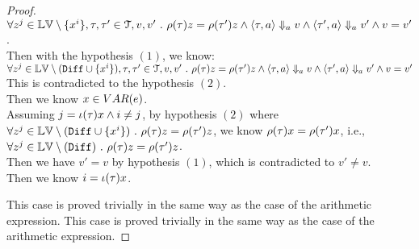\begin{proof}
$\forall z^j \in \mathbb{LV} \setminus \{x^i\}, \mathtt{\tau}, \mathtt{\tau}' \in \mathcal{T}, v, v' ~.~ 
\rho(\mathtt{\tau}) z = \rho(\mathtt{\tau}') z \land 
\langle \mathtt{\tau}, a \rangle \Downarrow_a v \land \langle \mathtt{\tau}', a \rangle \Downarrow_a v' \land v = v'$.
\\
Then with the hypothesis $(1)$, we know:
\\
$\forall z^j \in \mathbb{LV} \setminus (\mathtt{Diff} \cup \{x^i\} ), \mathtt{\tau}, \mathtt{\tau}' \in \mathcal{T}, v, v'~.~ 
\rho(\mathtt{\tau}) z = \rho(\mathtt{\tau}') z \land 
\langle \mathtt{\tau}, a \rangle \Downarrow_a v \land \langle \mathtt{\tau}', a \rangle \Downarrow_a v' \land v = v'$
\\
This is contradicted to the hypothesis $(2)$.
\\
Then we know $x \in VAR(e)$.
\\
Assuming $j = \iota(\mathtt{\tau}) x \land i \neq j$,
by hypothesis $(2)$ where 
$ \forall z^j \in \mathbb{LV} \setminus (\mathtt{Diff} \cup \{x^i\} )  ~.~\rho(\mathtt{\tau}) z = \rho(\mathtt{\tau}') z $, 
we know $\rho(\mathtt{\tau}) x = \rho(\mathtt{\tau}') x$, i.e., 
\\
$\forall z^j \in  \mathbb{LV} \setminus (\mathtt{Diff}  ) ~.~ \rho(\mathtt{\tau}) z = \rho(\mathtt{\tau}') z$.
\\
Then we have $v' = v$ by hypothesis $(1)$, which is contradicted to $v' \neq v$.
\\
Then we know $i = \iota(\mathtt{\tau}) x $.

This case is proved trivially in the same way as the case of the arithmetic expression.
This case is proved trivially in the same way as the case of the arithmetic expression.
\end{proof}
